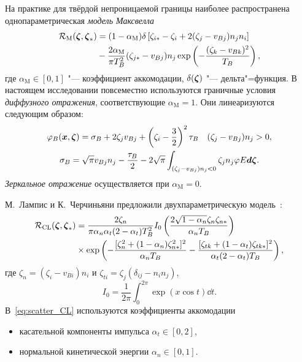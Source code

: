 На практике для твёрдой непроницаемой границы наиболее распространена однопараметрическая \emph{модель Максвелла}
\begin{equation}\label{eq:scatter_Maxwell}
    \begin{aligned}
        \mathcal{R}_\mathrm{M}({\boldsymbol{\zeta}},{\boldsymbol{\zeta}}_*) &= (1-\alpha_\mathrm{M})\delta\left[ \zeta_{i*} - \zeta_i + 2(\zeta_j-v_{Bj})n_jn_i \right] \\
        &-\frac{2\alpha_\mathrm{M}}{\pi T_B^2} (\zeta_{j*}-v_{Bj})n_j \exp\left( -\frac{(\zeta_k-v_{Bk})^2}{T_B} \right),
    \end{aligned}
\end{equation}
где \(\alpha_\mathrm{M}\in[0,1]\) "--- коэффициент аккомодации, \(\delta({\boldsymbol{\zeta}})\) "--- дельта"=функция.
В настоящем исследовании повсеместно используются граничные условия \emph{диффузного отражения},
соответствующие \(\alpha_\mathrm{M}=1\). Они линеаризуются следующим образом:
\begin{equation}\label{eq:linear_diffuse_bc}
    \begin{gathered}
        \varphi_B({\boldsymbol{x}}, {\boldsymbol{\zeta}}) = \sigma_B + 2\zeta_j v_{Bj} + \left(\zeta_i-\frac32\right)^2\tau_B
            \quad (\zeta_j-v_{Bj}) n_j > 0, \\
        \sigma_B = \sqrt\pi v_{Bj}n_j - \frac{\tau_B}2 -2\sqrt\pi
            \int_{(\zeta_j-v_{Bj})n_j < 0} \zeta_j n_j \varphi E\boldsymbol{d\zeta}.
    \end{gathered}
\end{equation}
\emph{Зеркальное отражение} осуществляется при \(\alpha_\mathrm{M}=0\).

М.~Лампис и К.~Черчиньяни предложили двухпараметрическую модель~\cite{Cercignani1971}:
\begin{equation}\label{eq:scatter_CL}
    \begin{aligned}
        \mathcal{R}_\mathrm{CL}({\boldsymbol{\zeta}},{\boldsymbol{\zeta}}_*) &= \frac{2\zeta_n}{\pi\alpha_n\alpha_t(2-\alpha_t)T_B^2}
            I_0\left( \frac{2\sqrt{1-\alpha_n} \zeta_n\zeta_{n*}}{\alpha_n T_B} \right) \\
        &\times\exp\left(
            -\frac{[\zeta_n^2+(1-\alpha_n)\zeta_{n*}^2]^2}{\alpha_n T_B}
            -\frac{[\zeta_{tk}+(1-\alpha_t)\zeta_{tk*}]^2}{\alpha_t(2-\alpha_t) T_B}
        \right),
    \end{aligned}
\end{equation}
где \(\zeta_n = (\zeta_i-v_{Bi})n_i\) и \(\zeta_{ti} = \zeta_j(\delta_{ij}-n_in_j)\),
\begin{equation}\label{eq:CL_I0}
    I_0 = \frac1{2\pi}\int_0^{2\pi} \exp(x\cos t)\dd{t}.
\end{equation}
В~\eqref{eq:scatter_CL} используются коэффициенты аккомодации
\begin{itemize}
    \item касательной компоненты импульса \(\alpha_t\in[0,2]\),
    \item нормальной кинетической энергии \(\alpha_n\in[0,1]\).
\end{itemize}

